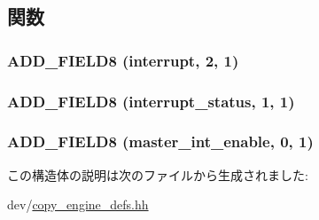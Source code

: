 \subsection{関数}
\hypertarget{structCopyEngineReg_1_1Regs_1_1INTRCTRL_ab54cf85b9369c95605f28ae500cc5383}{
\subsubsection[{ADD\_\-FIELD8}]{\setlength{\rightskip}{0pt plus 5cm}ADD\_\-FIELD8 (interrupt, \/  2, \/  1)}}
\label{structCopyEngineReg_1_1Regs_1_1INTRCTRL_ab54cf85b9369c95605f28ae500cc5383}
\hypertarget{structCopyEngineReg_1_1Regs_1_1INTRCTRL_a12d2d37587f4a319fd602bf182bfafff}{
\subsubsection[{ADD\_\-FIELD8}]{\setlength{\rightskip}{0pt plus 5cm}ADD\_\-FIELD8 (interrupt\_\-status, \/  1, \/  1)}}
\label{structCopyEngineReg_1_1Regs_1_1INTRCTRL_a12d2d37587f4a319fd602bf182bfafff}
\hypertarget{structCopyEngineReg_1_1Regs_1_1INTRCTRL_a12cbbc592306a66421660d8c72a3b611}{
\subsubsection[{ADD\_\-FIELD8}]{\setlength{\rightskip}{0pt plus 5cm}ADD\_\-FIELD8 (master\_\-int\_\-enable, \/  0, \/  1)}}
\label{structCopyEngineReg_1_1Regs_1_1INTRCTRL_a12cbbc592306a66421660d8c72a3b611}


この構造体の説明は次のファイルから生成されました:\begin{DoxyCompactItemize}
\item 
dev/\hyperlink{copy__engine__defs_8hh}{copy\_\-engine\_\-defs.hh}\end{DoxyCompactItemize}
